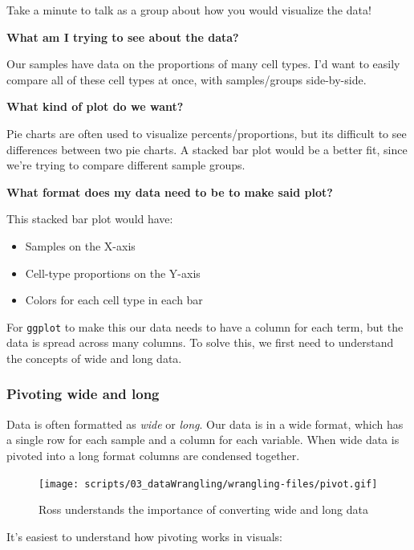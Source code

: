 \documentclass[
  letterpaper,
  DIV=11,
  numbers=noendperiod]{scrreprt}
\begin{document}
Take a minute to talk as a group about how you would visualize the data!

\textbf{What am I trying to see about the data?}

Our samples have data on the proportions of many cell types. I'd want to
easily compare all of these cell types at once, with samples/groups
side-by-side.

\textbf{What kind of plot do we want?}

Pie charts are often used to visualize percents/proportions, but its
difficult to see differences between two pie charts. A stacked bar plot
would be a better fit, since we're trying to compare different sample
groups.

\textbf{What format does my data need to be to make said plot?}

This stacked bar plot would have:

\begin{itemize}
\item
  Samples on the X-axis
\item
  Cell-type proportions on the Y-axis
\item
  Colors for each cell type in each bar
\end{itemize}

For \texttt{ggplot} to make this our data needs to have a column for
each term, but the data is spread across many columns. To solve this, we
first need to understand the concepts of wide and long data.

\subsubsection{Pivoting wide and long}\label{pivoting-wide-and-long}

Data is often formatted as \emph{wide} or \emph{long}. Our data is in a
wide format, which has a single row for each sample and a column for
each variable. When wide data is pivoted into a long format columns are
condensed together.

\begin{figure}[H]

{\centering \texttt{[image: scripts/03\_dataWrangling/wrangling-files/pivot.gif]}

}

\caption{Ross understands the importance of converting wide and long
data}

\end{figure}%

It's easiest to understand how pivoting works in visuals:
\end{document}
